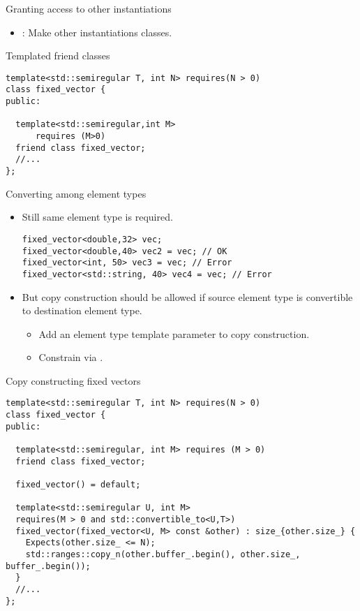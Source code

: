 \begin{frame}[t,fragile]{Granting access to other instantiations}
\begin{itemize}
  \item {}: Make other instantiations  classes.
\end{itemize}

\begin{block}{Templated friend classes}
\begin{lstlisting}
template<std::semiregular T, int N> requires(N > 0)
class fixed_vector {
public:

  template<std::semiregular,int M> 
      requires (M>0)
  friend class fixed_vector;
  //...
};
\end{lstlisting}
\end{block}
\end{frame}

\begin{frame}[t,fragile]{Converting among element types}
\begin{itemize}
  \item Still same element type is required.
\begin{lstlisting}
fixed_vector<double,32> vec;
fixed_vector<double,40> vec2 = vec; // OK
fixed_vector<int, 50> vec3 = vec; // Error
fixed_vector<std::string, 40> vec4 = vec; // Error
\end{lstlisting}

  \item But copy construction should be allowed if source element type is convertible
        to destination element type.
    \begin{itemize}
      \item Add an element type template parameter to copy construction.
      \item Constrain via .
    \end{itemize}
\end{itemize}
\end{frame}

\begin{frame}[t,fragile]
\begin{block}{Copy constructing fixed vectors}
\begin{lstlisting}
template<std::semiregular T, int N> requires(N > 0)
class fixed_vector {
public:

  template<std::semiregular, int M> requires (M > 0)
  friend class fixed_vector;

  fixed_vector() = default;

  template<std::semiregular U, int M>
  requires(M > 0 and std::convertible_to<U,T>)
  fixed_vector(fixed_vector<U, M> const &other) : size_{other.size_} {
    Expects(other.size_ <= N);
    std::ranges::copy_n(other.buffer_.begin(), other.size_, buffer_.begin());
  }
  //...
};
\end{lstlisting}
\end{block}
\end{frame}

